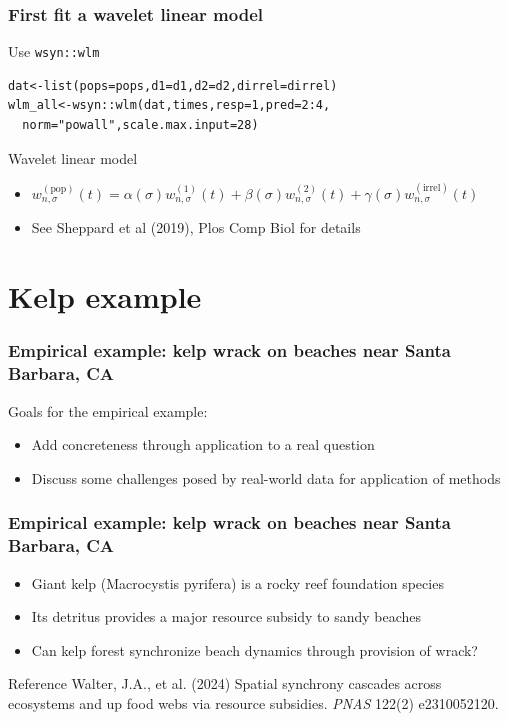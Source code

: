 \documentclass{beamer}
\begin{document}
\begin{frame}[fragile]
\frametitle{First fit a wavelet linear model}
\begin{exampleblock}{Use \texttt{wsyn::wlm}}
\begin{verbatim}
dat<-list(pops=pops,d1=d1,d2=d2,dirrel=dirrel)
wlm_all<-wsyn::wlm(dat,times,resp=1,pred=2:4,
  norm="powall",scale.max.input=28)
\end{verbatim}
\end{exampleblock}
\begin{block}{Wavelet linear model}
\begin{itemize}
\item $w^{(\text{pop})}_{n,\sigma}(t) = \alpha(\sigma) w^{(1)}_{n,\sigma}(t)+
\beta(\sigma) w^{(2)}_{n,\sigma}(t)+
\gamma(\sigma) w^{(\text{irrel})}_{n,\sigma}(t)$
\item See Sheppard et al (2019), Plos Comp Biol for details
\end{itemize}
\end{block}
\end{frame}


\section{Kelp example}

\begin{frame}
\frametitle{Empirical example: kelp wrack on beaches near Santa Barbara, CA}
Goals for the empirical example:
\begin{itemize}
\item Add concreteness through application to a real question
\item Discuss some challenges posed by real-world data for application of methods
\end{itemize}
\end{frame}

\begin{frame}
\frametitle{Empirical example: kelp wrack on beaches near Santa Barbara, CA}
\begin{itemize}
\item Giant kelp (Macrocystis pyrifera) is a rocky reef foundation species
\item Its detritus provides a major resource subsidy to sandy beaches
\item Can kelp forest synchronize beach dynamics through provision of wrack?
\end{itemize}
\begin{block}{Reference}
Walter, J.A., et al. (2024) Spatial synchrony cascades across ecosystems and up food webs via resource subsidies. \textit{PNAS} 122(2) e2310052120.
\end{block}
\end{frame}
\end{document}
